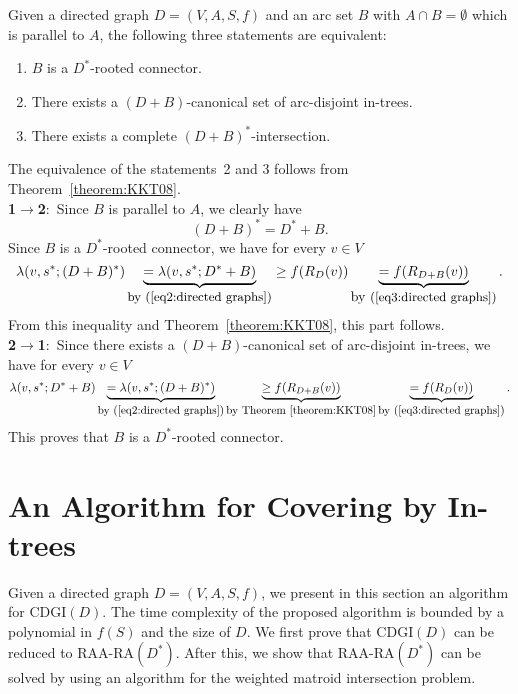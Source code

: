 \documentclass[11pt]{article}
\newcounter{ni}
\theoremstyle{plain}
\newcommand{\eop}{\hfill \usebox{\ProofSym}}
\newenvironment{proof}{\noindent {\it Proof.}}{\eop\par\vspace{0.3cm}}
\begin{document}
\begin{corollary} \label{corollary:KKT08}
Given a directed graph  $D=(V,A,S,f)$ and an arc set $B$ with $A\cap B=\emptyset$ 
which is parallel to 
$A$, the following three statements are equivalent$\colon$
\begin{enumerate}
\item $B$ is a $D^{\ast}$-rooted connector.
\item There exists a $(D+B)$-canonical set of arc-disjoint in-trees. 
\item There exists a complete $(D+B)^{\ast}$-intersection. 
\end{enumerate}
\end{corollary}
\begin{proof}
The equivalence of the statements~2 and 3 follows from Theorem~\ref{theorem:KKT08}.\\
{\bf 1$\to$2$\colon$}
Since $B$ is parallel to $A$, we clearly have 
\begin{equation} \label{eq2:directed graphs}
(D+B)^{\ast}=D^{\ast}+B. 
\end{equation}
Since $B$ is a $D^{\ast}$-rooted connector,
we have for every $v \in V$
\begin{equation*}
\lambda(v,s^{\ast};(D+B)^{\ast})
\underbrace{=\lambda(v,s^{\ast};D^{\ast}+B)}_{\mbox{\small by (\ref{eq2:directed graphs})}}
\ge f(R_D(v))
\underbrace{=f(R_{D+B}(v))}_{\mbox{by \small (\ref{eq3:directed graphs})}}.
\end{equation*}
From this inequality and Theorem~\ref{theorem:KKT08}, 
this part follows. \\
{\bf 2$\to$1$\colon$}
Since there exists a $(D+B)$-canonical set of  
arc-disjoint in-trees,
we have for every $v\in V$
\begin{equation*}
\lambda(v,s^{\ast};D^{\ast}+B)
\underbrace{=\lambda(v,s^{\ast};(D+B)^{\ast})}_{\mbox{\small by (\ref{eq2:directed graphs})}}
\underbrace{\ge f(R_{D+B}(v))}_{\mbox{\small by Theorem~\ref{theorem:KKT08}}}
\underbrace{=f(R_D(v))}_{\mbox{\small by (\ref{eq3:directed graphs})}}. 
\end{equation*}
This proves that $B$ is a $D^{\ast}$-rooted connector.
\end{proof}

\section{An Algorithm for Covering by In-trees}
\label{Algorithm}

Given a directed graph  $D=(V,A,S,f)$, we present in this section an algorithm for $\mbox{CDGI}(D)$. 
The time complexity of the proposed algorithm is bounded by a polynomial in $f(S)$ and the size of $D$. 
We first prove that $\mbox{CDGI}(D)$ can be reduced to $\mbox{RAA-RA}(D^{\ast})$. 
After this, we show that $\mbox{RAA-RA}(D^{\ast})$ can be solved by using 
an algorithm for the weighted matroid intersection problem. 
\end{document}
